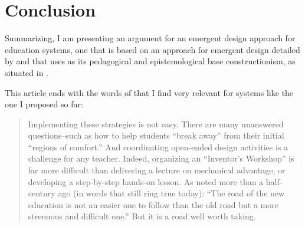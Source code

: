 
%
%
%

\section{Conclusion}

Summarizing, I am presenting an argument for an emergent design approach for
education systems, one that is based on an approach for emergent design detailed
by \cite{education:cavallo__technological_fluency} and that uses as its
pedagogical and epistemological base constructionism, as situated in
\cite{education:papert__situating_constructionism}.

This article ends with the words of
\cite{education:resnick&ocko_learning_through_design} that I find very relevant
for systems like the one I proposed so far:

\begin{quote} 
    Implementing these strategies is not easy. There are many unanswered
    questions--such as how to help students ``break away'' from their initial
    ``regions of comfort.'' And coordinating open-ended design activities is a
    challenge for any teacher. Indeed, organizing an ``Inventor's Workshop'' is
    far more difficult than delivering a lecture on mechanical advantage, or
    developing a step-by-step hands-on lesson. As
    \cite{education:dewey_experience_education} noted more than a half-century
    ago (in words that still ring true today): ``The road of the new education
    is not an easier one to follow than the old road but a more strenuous and
    difficult one.'' But it is a road well worth taking. 
\end{quote}

